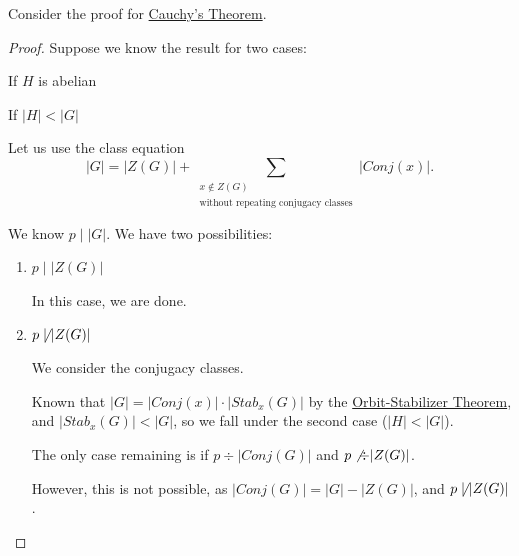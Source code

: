 \begin{example}
    Consider the proof for \hyperref[thm:cauchy]{Cauchy's Theorem}.

    \begin{proof}
        Suppose we know the result for two cases:

        \begin{listo}
            \item If $H$ is abelian
            \item If $|H| < |G|$
        \end{listo}

        Let us use the class equation \[
            |G| = |Z(G)| + \sum_{\substack{x \notin Z(G) \\\text{without repeating conjugacy classes}}} | Conj(x) |.
        \]

        We know $p \mid |G|$. We have two possibilities: \begin{enumerate}
            \item $p \mid |Z(G)|$

            In this case, we are done.

            \item $p \not\mid |Z(G)|$

            We consider the conjugacy classes. 

            Known that $|G| = |Conj(x)| \cdot |Stab_x(G)|$ by the \hyperref[thm:orbit-stabilizer]{Orbit-Stabilizer Theorem}, and $|Stab_x(G)| < |G|$, so we fall under the second case ($|H| < |G|$).

            The only case remaining is if $p \div |Conj(G)|$ and $p \not\div |Z(G)|$.

            However, this is not possible, as $|Conj(G)| = |G| - |Z(G)|$, and $p \not\mid |Z(G)|$. 
        \end{enumerate}
    \end{proof}
\end{example}